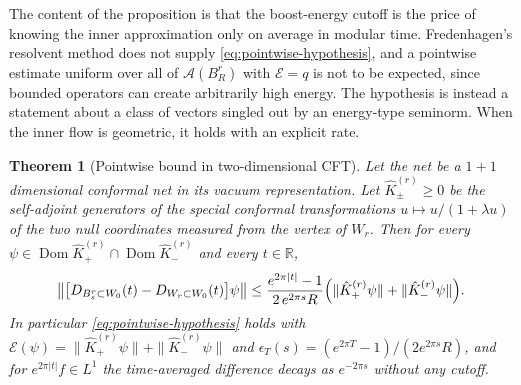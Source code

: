\documentclass[a4paper,11pt]{article}
\newtheorem{theorem}{Theorem}
\theoremstyle{definition}
\begin{document}
The content of the proposition is that the boost-energy cutoff is the price of knowing the inner approximation only on average in modular time. Fredenhagen's resolvent method does not supply \eqref{eq:pointwise-hypothesis}, and a pointwise estimate uniform over all of $\mathcal A(B_R^r)$ with $\mathcal E=q$ is not to be expected, since bounded operators can create arbitrarily high energy. The hypothesis is instead a statement about a class of vectors singled out by an energy-type seminorm. When the inner flow is geometric, it holds with an explicit rate.

\begin{theorem}[Pointwise bound in two-dimensional CFT]\label{thm:CFT-pointwise}
Let the net be a $1+1$ dimensional conformal net in its vacuum representation. Let $\hat K_\pm^{(r)}\ge0$ be the self-adjoint generators of the special conformal transformations $u\mapsto u/(1+\lambda u)$ of the two null coordinates measured from the vertex of $W_r$. Then for every $\psi\in\operatorname{Dom}\hat K_+^{(r)}\cap\operatorname{Dom}\hat K_-^{(r)}$ and every $t\in\mathbb R$,
\begin{equation}
 \bigl\|\bigl[D_{B_s^r\subset W_0}(t)-D_{W_r\subset W_0}(t)\bigr]\psi\bigr\|
 \le\frac{e^{2\pi|t|}-1}{2\,e^{2\pi s}R}\Bigl(\|\hat K_+^{(r)}\psi\|+\|\hat K_-^{(r)}\psi\|\Bigr).
 \label{eq:CFT-pointwise}
\end{equation}
In particular \eqref{eq:pointwise-hypothesis} holds with $\mathcal E(\psi)=\|\hat K_+^{(r)}\psi\|+\|\hat K_-^{(r)}\psi\|$ and $\epsilon_T(s)=(e^{2\pi T}-1)/(2e^{2\pi s}R)$, and for $e^{2\pi|t|}f\in L^1$ the time-averaged difference decays as $e^{-2\pi s}$ without any cutoff.
\end{theorem}
\end{document}
